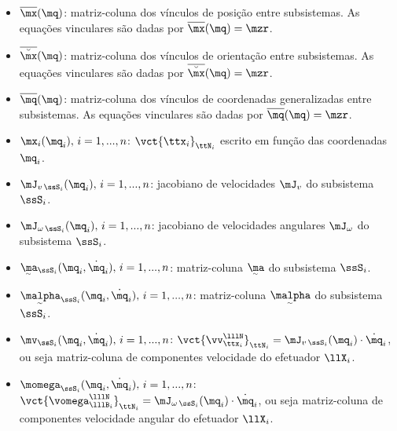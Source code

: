 \documentclass[]{politex}
\begin{document}
\begin{itemize}
\item $\overline{\mx}(\mq)$: matriz-coluna dos vínculos de posição entre subsistemas. As equações vinculares são dadas por $\overline{\mx}(\mq) = \mzr $.
\item $\overline{\breve{\mx}}(\mq)$: matriz-coluna dos vínculos de orientação entre subsistemas. As equações vinculares são dadas por $\overline{\breve{\mx}}(\mq) = \mzr $.
\item $\overline{\mq}(\mq)$: matriz-coluna dos vínculos de coordenadas generalizadas entre subsistemas. As equações vinculares são dadas por $\overline{\mq}(\mq) = \mzr $.
\item $\mx_i(\mq_i), \,i=1, ..., n$: $\vct{\ttx_i}_{\ttN_i}$ escrito em função das coordenadas $\mq_i$.
\item $\mJ_{v\,\ssS_i}(\mq_i), \,i=1, ..., n$: jacobiano de velocidades $\mJ_v$ do subsistema $\ssS_i$.
\item $\mJ_{\omega\,\ssS_i}(\mq_i), \,i=1, ..., n$: jacobiano de velocidades angulares $\mJ_\omega$ do subsistema $\ssS_i$.
\item $\underaccent{\sim}{\ma}_{\ssS_i}(\mq_i, \dot{\mq}_i), \,i=1, ..., n$: matriz-coluna $\underaccent{\sim}{\ma}$ do subsistema $\ssS_i$.
\item $\underaccent{\sim}{\malpha}_{\ssS_i}(\mq_i, \dot{\mq}_i), \,i=1, ..., n$: matriz-coluna $\underaccent{\sim}{\malpha}$ do subsistema $\ssS_i$.
\item $\mv_{\ssS_i}(\mq_i, \dot{\mq}_i), \,i=1, ..., n$: $\vct{\vv_{\ttx_i}^{\lllN}}_{\ttN_i} = \mJ_{v\,\ssS_i}(\mq_i) \cdot \dot{\mq}_i$, ou seja matriz-coluna de componentes velocidade do efetuador $\llX_i$.
\item $\momega_{\ssS_i}(\mq_i, \dot{\mq}_i), \,i=1, ..., n$: $\vct{\vomega_{\lllB_i}^{\lllN}}_{\ttN_i} = \mJ_{\omega\,\ssS_i}(\mq_i) \cdot \dot{\mq}_i$, ou seja matriz-coluna de componentes velocidade angular do efetuador $\llX_i$.

\end{itemize}
\end{document}
